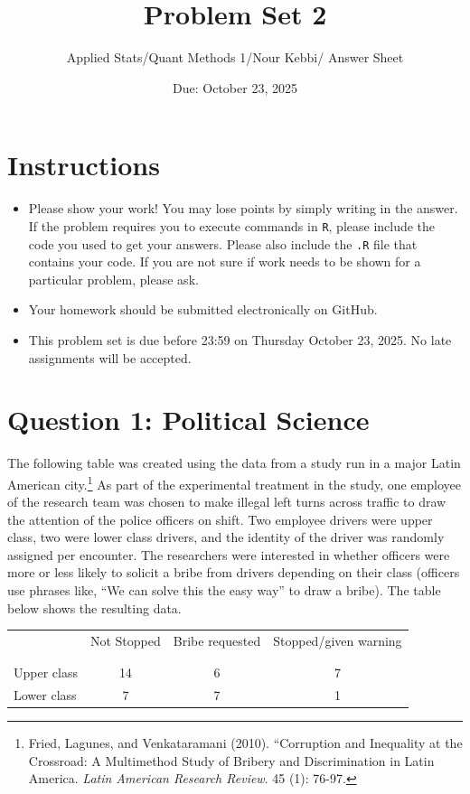 \documentclass[12pt,letterpaper]{article}
\title{Problem Set 2}
\date{Due: October 23, 2025}
\author{Applied Stats/Quant Methods 1/Nour Kebbi/ Answer Sheet}
\begin{document}
	\maketitle
	\section*{Instructions}
	\begin{itemize}
		\item Please show your work! You may lose points by simply writing in the answer. If the problem requires you to execute commands in \texttt{R}, please include the code you used to get your answers. Please also include the \texttt{.R} file that contains your code. If you are not sure if work needs to be shown for a particular problem, please ask.
		\item Your homework should be submitted electronically on GitHub.
		\item This problem set is due before 23:59 on Thursday October 23, 2025. No late assignments will be accepted.
		
	\end{itemize}
	
	
	\vspace{.5cm}
	\section*{Question 1: Political Science}
	\vspace{.25cm}
	The following table was created using the data from a study run in a major Latin American city.\footnote{Fried, Lagunes, and Venkataramani (2010). ``Corruption and Inequality at the Crossroad: A Multimethod Study of Bribery and Discrimination in Latin America. \textit{Latin American Research Review}. 45 (1): 76-97.} As part of the experimental treatment in the study, one employee of the research team was chosen to make illegal left turns across traffic to draw the attention of the police officers on shift. Two employee drivers were upper class, two were lower class drivers, and the identity of the driver was randomly assigned per encounter. The researchers were interested in whether officers were more or less likely to solicit a bribe from drivers depending on their class (officers use phrases like, ``We can solve this the easy way'' to draw a bribe). The table below shows the resulting data.
	
	\newpage
	\begin{table}[h!]
		\centering
		\begin{tabular}{l | c c c }
			& Not Stopped & Bribe requested & Stopped/given warning \\
			\\[-1.8ex]
			\hline \\[-1.8ex]
			Upper class & 14 & 6 & 7 \\
			Lower class & 7 & 7 & 1 \\
			\hline
		\end{tabular}
	\end{table}
	
\end{document}
